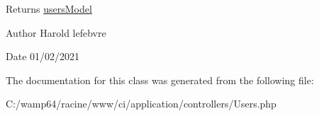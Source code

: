 \begin{DoxyReturn}{Returns}
\mbox{\hyperlink{classusers_model}{users\+Model}} 
\end{DoxyReturn}
\begin{DoxyAuthor}{Author}
Harold lefebvre 
\end{DoxyAuthor}
\begin{DoxyDate}{Date}
01/02/2021 
\end{DoxyDate}


The documentation for this class was generated from the following file\+:\begin{DoxyCompactItemize}
\item 
C\+:/wamp64/racine/www/ci/application/controllers/Users.\+php\end{DoxyCompactItemize}
